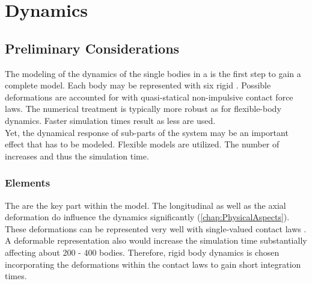 \section{Dynamics} \label{sec:Dynamics}

\subsection{Preliminary Considerations} \label{subsec:PreliminaryConsiderations}

The modeling of the dynamics of the single bodies in a \MBS is the first step to gain a complete model.
Each body may be represented with six rigid \DOFs.
Possible deformations are accounted for with quasi-statical non-impulsive contact force laws.
The numerical treatment is typically more robust as for flexible-body dynamics.
Faster simulation times result as less \DOFs are used.\\
Yet, the dynamical response of sub-parts of the system may be an important effect that has to be modeled.
Flexible models are utilized.
The number of \DOFs increases and thus the simulation time.\par%
%
%
\subsubsection{Elements}
%
The \els are the key part within the model.
The longitudinal as well as the axial deformation do influence the dynamics significantly (\cref{chap:PhysicalAspects}).
These deformations can be represented very well with single-valued contact laws \cite{geier_dynamics_2007}.
A deformable representation also would increase the simulation time substantially affecting about 200 - 400 bodies.
Therefore, rigid body dynamics is chosen incorporating the deformations within the contact laws to gain short integration times.
%
